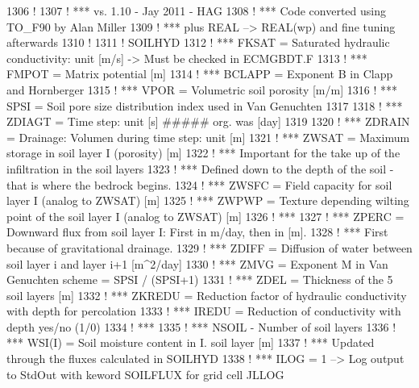 \begin{DoxyCode}
1306 \textcolor{comment}{!}
1307 \textcolor{comment}{!     *** vs. 1.10 - Jay 2011 - HAG}
1308 \textcolor{comment}{!     ***            Code converted using TO\_F90 by Alan Miller}
1309 \textcolor{comment}{!     ***            plus REAL --> REAL(wp) and fine tuning afterwards}
1310 \textcolor{comment}{!}
1311 \textcolor{comment}{!     SOILHYD}
1312 \textcolor{comment}{!     ***  FKSAT = Saturated hydraulic conductivity: unit [m/s] -> Must be checked in ECMGBDT.F}
1313 \textcolor{comment}{!     ***  FMPOT = Matrix potential [m]}
1314 \textcolor{comment}{!     *** BCLAPP = Exponent B in Clapp and Hornberger}
1315 \textcolor{comment}{!     ***   VPOR = Volumetric soil porosity [m/m]}
1316 \textcolor{comment}{!     ***   SPSI = Soil pore size distribution index used in Van Genuchten}
1317 
1318 \textcolor{comment}{!     *** ZDIAGT = Time step: unit [s]   ##### org. was [day]}
1319 
1320 \textcolor{comment}{!     *** ZDRAIN = Drainage: Volumen during time step: unit [m]}
1321 \textcolor{comment}{!     ***  ZWSAT = Maximum storage in soil layer I (porosity) [m]}
1322 \textcolor{comment}{!     ***          Important for the take up of the infiltration in the soil layers}
1323 \textcolor{comment}{!     ***          Defined down to the depth of the soil - that is where the bedrock begins.}
1324 \textcolor{comment}{!     ***  ZWSFC = Field capacity for soil layer I (analog to ZWSAT) [m]}
1325 \textcolor{comment}{!     ***  ZWPWP = Texture depending wilting point of the soil layer I (analog to ZWSAT) [m]}
1326 \textcolor{comment}{!     ***}
1327 \textcolor{comment}{!     ***  ZPERC = Downward flux from soil layer I: First in m/day, then in [m].}
1328 \textcolor{comment}{!     ***          First because of gravitational drainage.}
1329 \textcolor{comment}{!     ***  ZDIFF = Diffusion of water between soil layer i and layer i+1 [m^2/day]}
1330 \textcolor{comment}{!     ***   ZMVG = Exponent M in Van Genuchten scheme = SPSI / (SPSI+1)}
1331 \textcolor{comment}{!     ***   ZDEL = Thickness of the 5 soil layers [m]}
1332 \textcolor{comment}{!     *** ZKREDU = Reduction factor of hydraulic conductivity with depth for percolation}
1333 \textcolor{comment}{!     ***  IREDU = Reduction of conductivity with depth yes/no (1/0)}
1334 \textcolor{comment}{!     ***}
1335 \textcolor{comment}{!     ***  NSOIL - Number of soil layers}
1336 \textcolor{comment}{!     *** WSI(I) = Soil moisture content in I. soil layer [m]}
1337 \textcolor{comment}{!     ***          Updated through the fluxes calculated in SOILHYD}
1338 \textcolor{comment}{!     ***  ILOG =  1 --> Log output to StdOut with keword SOILFLUX for grid cell JLLOG}

\end{DoxyCode}
